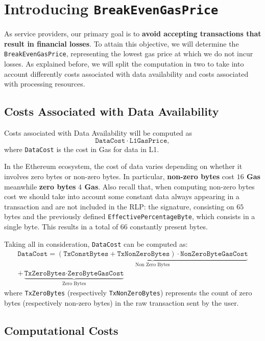 \section{Introducing \texttt{BreakEvenGasPrice}}

As service providers, our primary goal is to \textbf{avoid accepting transactions that result in financial losses}. To attain this objective, we will determine the \texttt{BreakEvenGasPrice}, representing the lowest gas price at which we do not incur losses. As explained before, we will split the computation in two to take into account differently costs associated with data availability and costs associated with processing resources.


\subsection{Costs Associated with Data Availability}

Costs associated with Data Availability will be computed as
\[
\texttt{DataCost} \cdot \texttt{L1GasPrice},
\]
where \texttt{DataCost} is the cost in Gas for data in L1.

In the Ethereum ecosystem, the cost of data varies depending on whether it involves zero bytes or non-zero bytes. In particular, \textbf{non-zero bytes} cost \textbf{$16$ Gas} meanwhile \textbf{zero bytes} \textbf{$4$ Gas}. Also recall that, when computing non-zero bytes cost we should take into account some constant data always appearing in a transaction and are not included in the RLP: the signature, consisting on $65$ bytes and the previously defined \texttt{EffectivePercentageByte}, which consists in a single byte. This results in a total of $66$ constantly present bytes.

Taking all in consideration, \texttt{DataCost} can be computed as:
\begin{gather*}
\texttt{DataCost} = \underbrace{(\texttt{TxConstBytes} + \texttt{TxNonZeroBytes}) \cdot \texttt{NonZeroByteGasCost}}_\text{Non Zero Bytes} \\
+ \underbrace{\texttt{TxZeroBytes} \cdot \texttt{ZeroByteGasCost}}_\text{Zero Bytes}
\end{gather*}
where \texttt{TxZeroBytes} (respectively \texttt{TxNonZeroBytes}) represents the count of zero bytes (respectively non-zero bytes) in the raw transaction sent by the user.


\subsection{Computational Costs}

